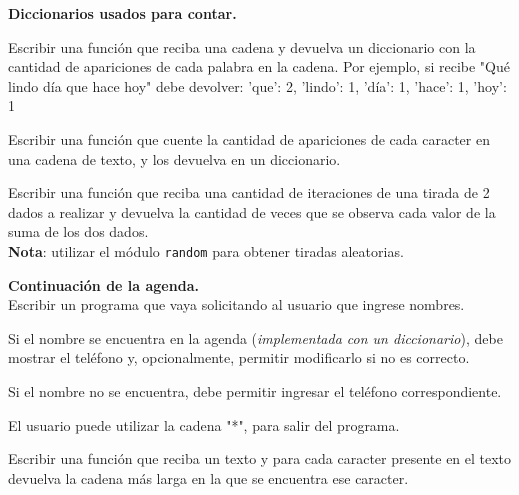 \begin{ejercicio}
{\bf Diccionarios usados para contar.}
\begin{partes}
  \item Escribir una función que reciba una cadena y devuelva un diccionario con
la cantidad de apariciones de cada palabra en la cadena.  Por ejemplo, si
recibe "Qué lindo día que hace hoy" debe devolver: { 'que': 2, 'lindo': 1,
'día': 1, 'hace': 1, 'hoy': 1}

  \item Escribir una función que cuente la cantidad de apariciones de cada
caracter en una cadena de texto, y los devuelva en un diccionario.

  \item Escribir una función que reciba una cantidad de iteraciones de una tirada
de 2 dados a realizar y devuelva la cantidad de veces que se observa cada valor
de la suma de los dos dados. \\
{\bf Nota}: utilizar el módulo \verb!random! para obtener tiradas aleatorias.
\end{partes}
\end{ejercicio}

\begin{ejercicio}
{\bf Continuación de la agenda.} \\
Escribir un programa que vaya solicitando al usuario que ingrese nombres.
\begin{partes}
  \item Si el nombre se encuentra en la agenda ({\it implementada con un
diccionario}), debe mostrar el teléfono y, opcionalmente, permitir
modificarlo si no es correcto.
  \item Si el nombre no se encuentra, debe permitir ingresar el teléfono
correspondiente.
\end{partes}
El usuario puede utilizar la cadena "*", para salir del programa.
\end{ejercicio}

\begin{ejercicio}
Escribir una función que reciba un texto y para cada caracter presente en el
texto devuelva la cadena más larga en la que se encuentra ese caracter.
\end{ejercicio}

